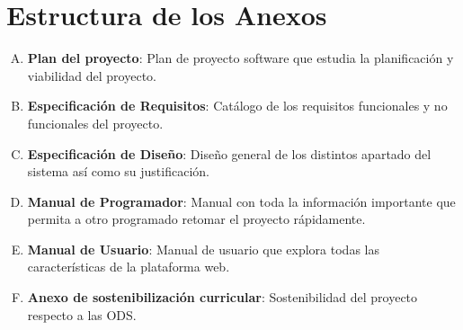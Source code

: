 \section{Estructura de los Anexos}

\begin{enumerate}[A.]
    \item \textbf{Plan del proyecto}: Plan de proyecto software que estudia la planificación y viabilidad del proyecto. 
    \item \textbf{Especificación de Requisitos}: Catálogo de los requisitos funcionales y no funcionales del proyecto.
    \item \textbf{Especificación de Diseño}: Diseño general de los distintos apartado del sistema así como su justificación.
    \item \textbf{Manual de Programador}: Manual con toda la información importante que permita a otro programado retomar el proyecto rápidamente.
    \item \textbf{Manual de Usuario}: Manual de usuario que explora todas las características de la plataforma web. 
    \item \textbf{Anexo de sostenibilización curricular}: Sostenibilidad del proyecto respecto a las ODS.
\end{enumerate}

